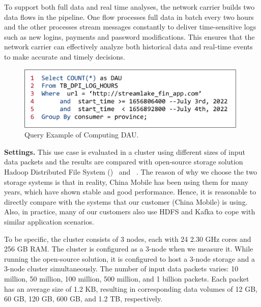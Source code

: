 To support both full data and real time analyses, the network carrier builds two data flows in the pipeline. One flow processes full data in batch every two hours and the other processes stream messages constantly to deliver time-sensitive logs such as new logins, payments and password modifications. This ensures that the network carrier can effectively analyze both historical data and real-time events to make  accurate and timely decisions.

 \begin{figure}[htbp]
	\includegraphics[scale=0.35]{figures/sql}
	\centering
	\vspace{-1em}
	\caption{Query Example of Computing DAU.}
	\label{exp:fig:sql}
\end{figure}

\noindent \textbf{Settings.} This use case is evaluated in a  cluster using different sizes of input data packets and the results are compared with open-source storage solution Hadoop Distributed File System (\hdfs)~\cite{hdfs} and \kafka~\cite{kafka}. The reason of why we choose the two storage systems is that in reality, China Mobile has been using them for many years, which have shown stable and good performance. Hence, it is  reasonable to directly compare with the systems that our customer (China Mobile) is using. Also, in practice, many of our customers also use HDFS and Kafka to cope with similar application scenarios.




 
  To be specific, the cluster consists of 3 nodes, each with 24  2.30 GHz cores and 256 GB RAM. The cluster is configured as a 3-node \sys when we measure it.  While running the open-source solution, it is configured to host a 3-node \hdfs storage and a 3-node \kafka cluster simultaneously. The number of input data packets varies: 10 million, 50 million, 100 million, 500 million, and 1 billion packets. Each packet has an average size of 1.2 KB, resulting in corresponding data volumes of 12 GB, 60 GB, 120 GB, 600 GB, and 1.2 TB, respectively.

